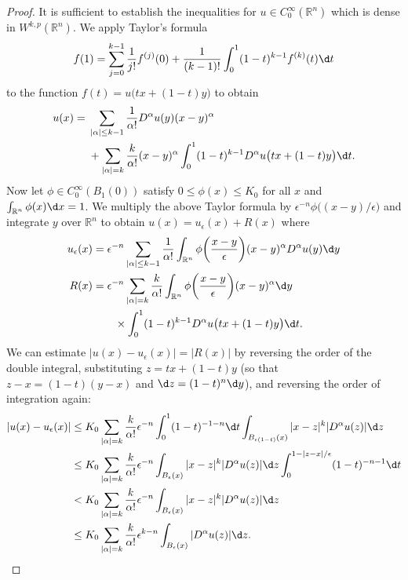 \begin{proof}
  It is sufficient to establish the inequalities for $u\in C_0^\infty(\mathbb{R}^n)$
  which is dense in $W^{k,p}(\mathbb{R}^n)$. We apply Taylor's formula
  \[ f(1) = \sum_{j=0}^{k-1} \frac{1}{j!} f^{(j)}(0)
      + \frac{1}{(k-1)!} \int_0^1 (1-t)^{k-1} f^{(k)}(t) \d t \]
  to the function $f(t) = u\bigl(tx+(1-t)y\bigr)$ to obtain
  \begin{align*}
    u(x) ={}
    & \sum_{|\alpha|\leq k-1} \frac{1}{\alpha!} D^\alpha u(y) (x-y)^\alpha \\
    & + \sum_{|\alpha|=k} \frac{k}{\alpha!} (x-y)^\alpha
        \int_0^1 (1-t)^{k-1} D^\alpha u\bigl(tx+(1-t)y\bigr) \d t.
  \end{align*}
  Now let $\phi\in C_0^\infty(B_1(0))$ satisfy $0\leq\phi(x)\leq K_0$
  for all $x$ and $\int_{\mathbb{R}^n} \phi(x) \d x=1$. We multiply
  the above Taylor formula by $\epsilon^{-n} \phi\bigl((x-y)/\epsilon\bigr)$
  and integrate $y$ over $\mathbb{R}^n$ to obtain $u(x) = u_{\epsilon}(x) + R(x)$
  where
  \begin{align*}
    u_{\epsilon}(x)
    & = \epsilon^{-n} \sum_{|\alpha|\leq k-1} \frac{1}{\alpha!}
        \int_{\mathbb{R}^n} \phi\biggl(\frac{x-y}{\epsilon}\biggr) (x-y)^\alpha
          D^\alpha u(y) \d y \\
    R(x)
    & = \epsilon^{-n} \sum_{|\alpha|=k} \frac{k}{\alpha!}
        \int_{\mathbb{R}^n} \phi\biggl(\frac{x-y}{\epsilon}\biggr) (x-y)^\alpha \d y \\
    &   \qquad \times \int_0^1 (1-t)^{k-1} D^\alpha u\bigl(tx+(1-t)y\bigr) \d t.
  \end{align*}
  We can estimate $|u(x)-u_{\epsilon}(x)| = |R(x)|$ by reversing the order
  of the double integral, substituting $z = tx+(1-t)y$ (so that $z-x = (1-t)(y-x)$
  and $\d z = (1-t)^n \d y$), and reversing the order of integration again:
  \begin{align*}
    |u(x) - u_{\epsilon}(x)|
    & \leq K_0 \sum_{|\alpha|=k} \frac{k}{\alpha!} \epsilon^{-n}
        \int_0^1 (1-t)^{-1-n} \d t \int_{B_{\epsilon(1-t)}(x)} |x-z|^k |D^\alpha u(z)| \d z \\
    & \leq K_0 \sum_{|\alpha|=k} \frac{k}{\alpha!} \epsilon^{-n}
        \int_{B_{\epsilon}(x)} |x-z|^k |D^\alpha u(z)| \d z
        \int_0^{1-|z-x|/\epsilon} (1-t)^{-n-1} \d t \\
    & < K_0 \sum_{|\alpha|=k} \frac{k}{\alpha!} \epsilon^{-n}
        \int_{B_{\epsilon}(x)} |x-z|^k |D^\alpha u(z)| \d z \\
    & \leq K_0 \sum_{|\alpha|=k} \frac{k}{\alpha!} \epsilon^{k-n}
        \int_{B_{\epsilon}(x)} |D^\alpha u(z)| \d z.
  \end{align*}
\end{proof}